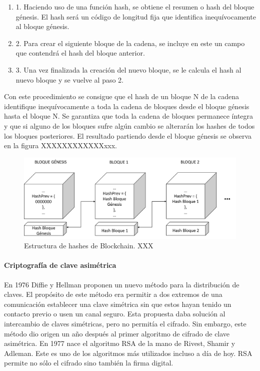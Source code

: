 \begin{enumerate}
	\item 1.	Haciendo uso de una función hash, se obtiene el resumen o hash del bloque génesis. El hash será un código de longitud fija que identifica inequívocamente al bloque génesis.
	\item 2.	Para crear el siguiente bloque de la cadena, se incluye en este un campo que contendrá el hash del bloque anterior.
	\item 3.	Una vez finalizada la creación del nuevo bloque, se le calcula el hash al nuevo bloque y se vuelve al paso 2.
\end{enumerate}

Con este procedimiento se consigue que el hash de un bloque N de la cadena identifique inequívocamente a toda la cadena de bloques desde el bloque génesis hasta el bloque N. Se garantiza que toda la cadena de bloques permanece íntegra y que si alguno de los bloques sufre algún cambio se alterarán los hashes de todos los bloques posteriores. El resultado partiendo desde el bloque génesis se observa en la figura XXXXXXXXXXXXxxx.\newline

\begin{figure}
	\centering
	\includegraphics[width=1\textwidth]{imagenes/PrevHashes.PNG}
	\caption{\label{fig1}Estructura de hashes de Blockchain. XXX}
\end{figure}

\paragraph{Criptografía de clave asimétrica}
En 1976 Diffie y Hellman proponen un nuevo método para la distribución de claves. El propósito de este método era permitir a dos extremos de una comunicación establecer una clave simétrica sin que estos hayan tenido un contacto previo o usen un canal seguro. Esta propuesta daba solución al intercambio de claves simétricas, pero no permitía el cifrado. Sin embargo, este método dio origen un año después al primer algoritmo de cifrado de clave asimétrica. En 1977 nace el algoritmo RSA de la mano de Rivest, Shamir y Adleman. Este es uno de los algoritmos más utilizados incluso a día de hoy. RSA permite no sólo el cifrado sino también la firma digital. \newline

